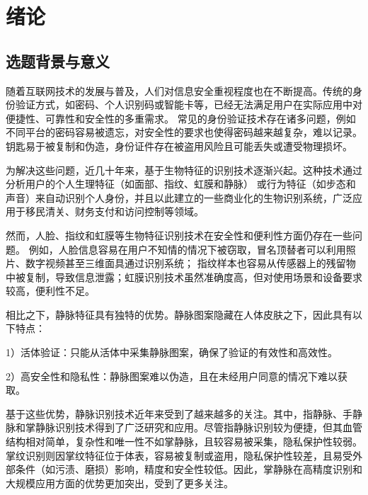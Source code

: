 
\chapter{绪论}
\label{cha:introduction}
\section{选题背景与意义}
\label{sec:background}

随着互联网技术的发展与普及，人们对信息安全重视程度也在不断提高。传统的身份验证方式，如密码、个人识别码或智能卡等，已经无法满足用户在实际应用中对便捷性、可靠性和安全性的多重需求。
常见的身份验证技术存在诸多问题，例如不同平台的密码容易被遗忘，对安全性的要求也使得密码越来越复杂，难以记录。钥匙易于被复制和伪造，身份证件存在被盗用风险且可能丢失或遭受物理损坏。

为解决这些问题，近几十年来，基于生物特征的识别技术逐渐兴起。这种技术通过分析用户的个人生理特征（如面部\cite{turk1991face}、指纹\cite{jain1997line}、虹膜\cite{daugman2009iris}和静脉\cite{qin2017deep}）
或行为特征（如步态\cite{wang2003silhouette}和声音\cite{perrachione2011human}）来自动识别个人身份，并且以此建立的一些商业化的生物识别系统，广泛应用于移民清关、财务支付和访问控制等领域。

然而，人脸、指纹和虹膜等生物特征识别技术在安全性和便利性方面仍存在一些问题。
例如，人脸信息容易在用户不知情的情况下被窃取\cite{chingovska2012effectiveness}，冒名顶替者可以利用照片、数字视频甚至三维面具\cite{nesli2013spoofing}通过识别系统；
指纹样本也容易从传感器上的残留物中被复制，导致信息泄露；虹膜识别技术虽然准确度高，但对使用场景和设备要求较高，便利性不足。

相比之下，静脉特征具有独特的优势。静脉图案隐藏在人体皮肤之下，因此具有以下特点：

1）活体验证：只能从活体中采集静脉图案，确保了验证的有效性和高效性。

2）高安全性和隐私性：静脉图案难以伪造，且在未经用户同意的情况下难以获取。

基于这些优势，静脉识别技术近年来受到了越来越多的关注。其中，指静脉、手静脉和掌静脉识别技术得到了广泛研究和应用。尽管指静脉识别较为便捷，但其血管结构相对简单，复杂性和唯一性不如掌静脉，且较容易被采集，隐私保护性较弱。掌纹识别则因掌纹特征位于体表，容易被复制或盗用，隐私保护性较差，且易受外部条件（如污渍、磨损）影响，精度和安全性较低。因此，掌静脉在高精度识别和大规模应用方面的优势更加突出，受到了更多关注。
